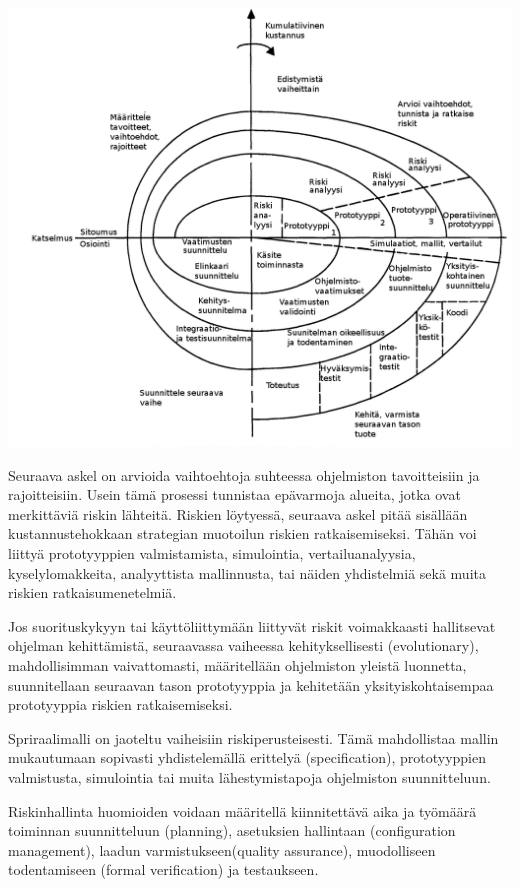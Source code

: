 \documentclass[finnish]{tktltiki2}
\theoremstyle{definition}
\theoremstyle{remark}
\begin{document}
\includegraphics[width=\textwidth]{spiral}

Seuraava askel on arvioida vaihtoehtoja suhteessa ohjelmiston tavoitteisiin ja rajoitteisiin. Usein tämä prosessi tunnistaa epävarmoja alueita, jotka ovat merkittäviä riskin lähteitä. Riskien löytyessä, seuraava askel pitää sisällään kustannustehokkaan strategian muotoilun riskien ratkaisemiseksi. Tähän voi liittyä prototyyppien valmistamista, simulointia, vertailuanalyysia, kyselylomakkeita, analyyttista mallinnusta, tai näiden yhdistelmiä sekä muita riskien ratkaisumenetelmiä\cite{BOE88}.


Jos suorituskykyyn tai käyttöliittymään liittyvät riskit voimakkaasti hallitsevat ohjelman kehittämistä, seuraavassa vaiheessa kehityksellisesti (evolutionary), mahdollisimman vaivattomasti, määritellään ohjelmiston yleistä luonnetta, suunnitellaan seuraavan tason prototyyppia ja kehitetään yksityiskohtaisempaa prototyyppia riskien ratkaisemiseksi\cite{BOE88}.

Spriraalimalli on jaoteltu vaiheisiin riskiperusteisesti. Tämä mahdollistaa mallin mukautumaan sopivasti yhdistelemällä erittelyä (specification), prototyyppien valmistusta, simulointia tai muita lähestymistapoja ohjelmiston suunnitteluun\cite{BOE88}.

Riskinhallinta huomioiden voidaan määritellä kiinnitettävä aika ja työmäärä toiminnan suunnitteluun (planning), asetuksien hallintaan (configuration management), laadun varmistukseen(quality assurance), muodolliseen todentamiseen (formal verification) ja testaukseen\cite{BOE88}.
\end{document}
